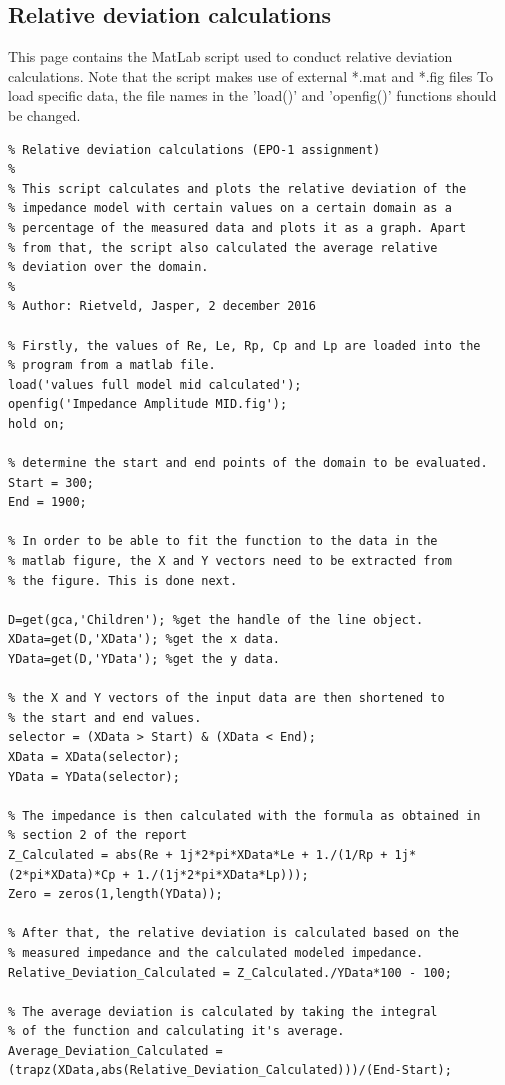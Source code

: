 \documentclass{article}
\begin{document}
\newpage\subsection{Relative deviation calculations}
This page contains  the MatLab script used to conduct relative deviation calculations. Note that the script makes use of external *.mat and *.fig files To load specific data, the file names in the 'load()' and 'openfig()' functions should be changed.
\begin{lstlisting}
% Relative deviation calculations (EPO-1 assignment)
%
% This script calculates and plots the relative deviation of the
% impedance model with certain values on a certain domain as a
% percentage of the measured data and plots it as a graph. Apart
% from that, the script also calculated the average relative
% deviation over the domain.
% 
% Author: Rietveld, Jasper, 2 december 2016

% Firstly, the values of Re, Le, Rp, Cp and Lp are loaded into the 
% program from a matlab file.
load('values full model mid calculated');
openfig('Impedance Amplitude MID.fig');
hold on;

% determine the start and end points of the domain to be evaluated.
Start = 300;
End = 1900;

% In order to be able to fit the function to the data in the
% matlab figure, the X and Y vectors need to be extracted from
% the figure. This is done next.

D=get(gca,'Children'); %get the handle of the line object.
XData=get(D,'XData'); %get the x data.
YData=get(D,'YData'); %get the y data.

% the X and Y vectors of the input data are then shortened to
% the start and end values.
selector = (XData > Start) & (XData < End);
XData = XData(selector);
YData = YData(selector);

% The impedance is then calculated with the formula as obtained in
% section 2 of the report
Z_Calculated = abs(Re + 1j*2*pi*XData*Le + 1./(1/Rp + 1j*(2*pi*XData)*Cp + 1./(1j*2*pi*XData*Lp)));
Zero = zeros(1,length(YData));

% After that, the relative deviation is calculated based on the
% measured impedance and the calculated modeled impedance.
Relative_Deviation_Calculated = Z_Calculated./YData*100 - 100;

% The average deviation is calculated by taking the integral 
% of the function and calculating it's average.
Average_Deviation_Calculated = (trapz(XData,abs(Relative_Deviation_Calculated)))/(End-Start);


\end{lstlisting}
\end{document}
